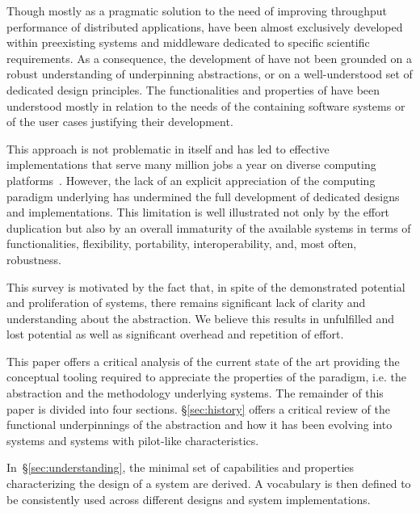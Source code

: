 \documentclass{sig-alternate}
\begin{document}


Though mostly as a pragmatic solution to the need of improving throughput
performance of distributed applications, \pilotjobs have been almost exclusively
developed within preexisting systems and middleware dedicated to specific
scientific requirements. As a consequence, the development of \pilotjobs have
not been grounded on a robust understanding of underpinning abstractions, or on
a well-understood set of dedicated design principles. The functionalities and
properties of \pilotjobs have been understood mostly in relation to the needs of
the containing software systems or of the user cases justifying their
development.

This approach is not problematic in itself and has led to effective
implementations that serve many million jobs a year on diverse computing
platforms~\cite{maeno2014,katz2012}. However, the lack of an explicit
appreciation of the computing paradigm underlying \pilotjobs has undermined the
full development of dedicated designs and implementations. This limitation is
well illustrated not only by the effort duplication but also by an overall
immaturity of the available systems in terms of functionalities, flexibility,
portability, interoperability, and, most often, robustness.

This survey is motivated by the fact that, in spite of the demonstrated
potential and proliferation of \pilotjob systems, there remains significant lack
of clarity and understanding about the \pilotjob abstraction. We believe this
results in unfulfilled and lost potential as well as significant overhead and
repetition of effort.

This paper offers a critical analysis of the current state of the art providing
the conceptual tooling required to appreciate the properties of the \pilot
paradigm, i.e. the abstraction and the methodology underlying \pilotjobs
systems. The remainder of this paper is divided into four sections.
\S\ref{sec:history} offers a critical review of the functional underpinnings of
the \pilot abstraction and how it has been evolving into \pilotjob systems and
systems with pilot-like characteristics.

In~\S\ref{sec:understanding}, the minimal set of capabilities and properties
characterizing the design of a \pilotjob system are derived. A vocabulary is
then defined to be consistently used across different designs and
\pilotjob system implementations.
\end{document}
